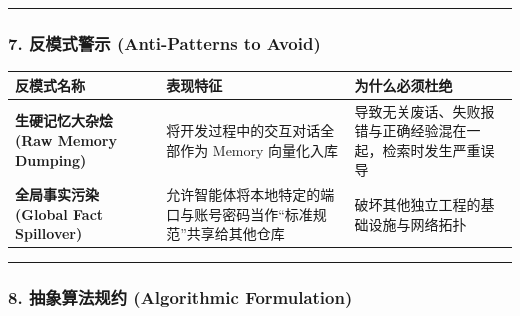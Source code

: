 \begin{center}\rule{0.5\linewidth}{0.5pt}\end{center}

\subsubsection{7. 反模式警示 (Anti-Patterns to
Avoid)}\label{ux53cdux6a21ux5f0fux8b66ux793a-anti-patterns-to-avoid-12}

{\def\LTcaptype{} %
\begin{longtable}[]{@{}
  >{\raggedright\arraybackslash}p{}
  >{\raggedright\arraybackslash}p{}
  >{\raggedright\arraybackslash}p{}@{}}
\toprule\noalign{}
\begin{minipage}[b]{\linewidth}\raggedright
反模式名称
\end{minipage} & \begin{minipage}[b]{\linewidth}\raggedright
表现特征
\end{minipage} & \begin{minipage}[b]{\linewidth}\raggedright
为什么必须杜绝
\end{minipage} \\
\midrule\noalign{}
\endhead
\bottomrule\noalign{}
\endlastfoot
\textbf{生硬记忆大杂烩 (Raw Memory Dumping)} &
将开发过程中的交互对话全部作为 Memory 向量化入库 &
导致无关废话、失败报错与正确经验混在一起，检索时发生严重误导 \\
\textbf{全局事实污染 (Global Fact Spillover)} &
允许智能体将本地特定的端口与账号密码当作``标准规范''共享给其他仓库 &
破坏其他独立工程的基础设施与网络拓扑 \\
\end{longtable}
}

\begin{center}\rule{0.5\linewidth}{0.5pt}\end{center}

\subsubsection{8. 抽象算法规约 (Algorithmic
Formulation)}\label{ux62bdux8c61ux7b97ux6cd5ux89c4ux7ea6-algorithmic-formulation-11}

